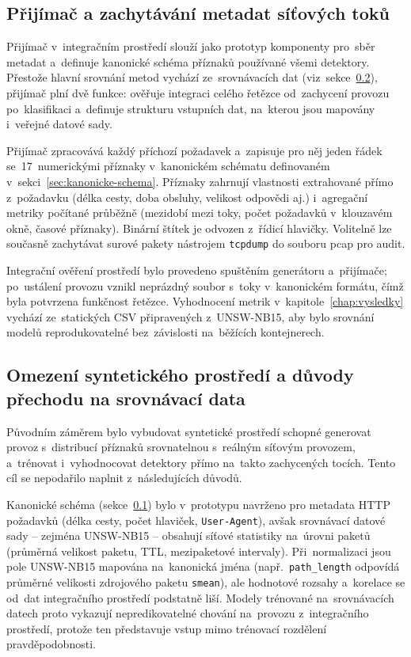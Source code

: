 \subsection{Přijímač a zachytávání metadat síťových toků}
\label{sec:prijimac}

Přijímač v~integračním prostředí slouží jako prototyp komponenty pro~sběr metadat a~definuje kanonické schéma příznaků používané všemi detektory. Přestože hlavní srovnání metod vychází ze~srovnávacích dat (viz~sekce~\ref{sec:omezeni-synteticke}), přijímač plní dvě funkce: ověřuje integraci celého řetězce od~zachycení provozu po~klasifikaci a~definuje strukturu vstupních dat, na~kterou jsou mapovány i~veřejné datové sady.

Přijímač zpracovává každý příchozí požadavek a~zapisuje pro něj jeden řádek se~17~numerickými příznaky v~kanonickém schématu definovaném v~sekci~\ref{sec:kanonicke-schema}. Příznaky zahrnují vlastnosti extrahované přímo z~požadavku (délka cesty, doba obsluhy, velikost odpovědi aj.) i~agregační metriky počítané průběžně (mezidobí mezi toky, počet požadavků v~klouzavém okně, časové příznaky). Binární štítek  je odvozen z~řídicí hlavičky. Volitelně lze současně zachytávat surové pakety nástrojem \texttt{tcpdump} do souboru pcap pro audit.

Integrační ověření prostředí bylo provedeno spuštěním generátoru a~přijímače; po~ustálení provozu vznikl neprázdný soubor s~toky v~kanonickém formátu, čímž byla potvrzena funkčnost řetězce. Vyhodnocení metrik v~kapitole~\ref{chap:vysledky} vychází ze~statických CSV připravených z~UNSW-NB15, aby bylo srovnání modelů reprodukovatelné bez~závislosti na~běžících kontejnerech.

\subsection{Omezení syntetického prostředí a důvody přechodu na srovnávací data}
\label{sec:omezeni-synteticke}

Původním záměrem bylo vybudovat syntetické prostředí schopné generovat provoz s~distribucí příznaků srovnatelnou s~reálným síťovým provozem, a~trénovat i~vyhodnocovat detektory přímo na~takto zachycených tocích. Tento cíl se nepodařilo naplnit z~následujících důvodů.

Kanonické schéma (sekce~\ref{sec:prijimac}) bylo v~prototypu navrženo pro metadata HTTP požadavků (délka cesty, počet hlaviček, \texttt{User-Agent}), avšak srovnávací datové sady -- zejména UNSW-NB15 -- obsahují síťové statistiky na~úrovni paketů (průměrná velikost paketu, TTL, mezipaketové intervaly). Při~normalizaci jsou pole UNSW-NB15 mapována na~kanonická jména (např.~\texttt{path\_length} odpovídá průměrné velikosti zdrojového paketu \texttt{smean}), ale hodnotové rozsahy a~korelace se od~dat integračního prostředí podstatně liší. Modely trénované na~srovnávacích datech proto vykazují nepredikovatelné chování na~provozu z~integračního prostředí, protože ten představuje vstup mimo trénovací rozdělení pravděpodobnosti.

